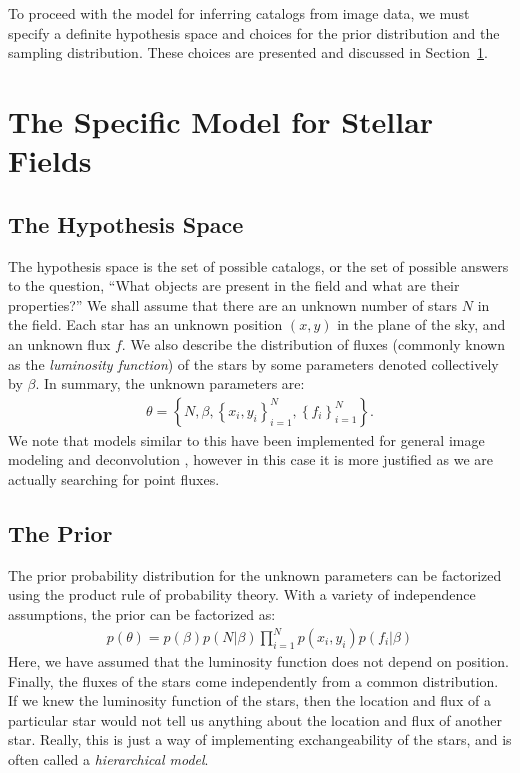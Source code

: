 \documentclass[12pt, preprint]{aastex}
\begin{document}
To proceed with the model for inferring catalogs
from image data, we must
specify a definite hypothesis space and choices for the prior distribution
and the sampling distribution. These choices are presented and discussed in
Section~\ref{sec:model}.

\section{The Specific Model for Stellar Fields}\label{sec:model}
\subsection{The Hypothesis Space}
The hypothesis space is the set of possible catalogs, or the set of possible
answers to the question, ``What objects are present in the field and
what are their properties?'' We shall assume that there are an unknown number of stars
$N$ in the field. Each star has an unknown
position $(x,y)$ in the plane of the sky, and an unknown flux $f$. We also
describe the distribution of fluxes (commonly known as the {\it luminosity
function}) of the stars by some parameters denoted collectively by $\beta$.
In summary, the unknown parameters are:
\begin{eqnarray}
\theta = \left\{N, \beta, \left\{x_i, y_i\right\}_{i=1}^N,
\left\{f_i\right\}_{i=1}^N\right\}.
\end{eqnarray}
We note that models similar to this have been implemented for general image
modeling and deconvolution \citep[e.g.][]{massinf}, however in this case it is
more justified as we are actually searching for point fluxes.

\subsection{The Prior}
The prior probability distribution for the unknown parameters can be factorized
using the product rule of probability theory.
With a variety of independence assumptions, the prior
can be factorized as:
\begin{eqnarray}
p(\theta) = p(\beta)p(N|\beta)\prod_{i=1}^N p(x_i, y_i)
p(f_i | \beta)
\end{eqnarray}
Here, we have assumed that the luminosity function does not depend on position.
Finally, the fluxes of the stars come independently from
a common distribution. If we knew the luminosity
function of the stars, then the location and flux of a particular star would
not tell us anything about the location and flux of another star. Really, this
is just a way of implementing exchangeability of the stars, and is often
called a {\it hierarchical model}.
\end{document}
